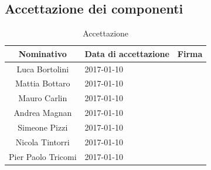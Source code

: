 \documentclass[a4paper,titlepage]{article}
\begin{document}
\subsection{Accettazione dei componenti}
\begin{table}[htbp]
	\begin{center}
		\setlength{\extrarowheight}{\jot}
		\begin{tabular}{|c|p{3.5cm}|p{6cm}|}
			\hline
			\textbf{Nominativo} & \textbf{Data di accettazione} & \textbf{Firma} \\[1ex]
			\hline
			Luca Bortolini	&	2017-01-10	& \\[1ex]
			\hline
			Mattia Bottaro		&	2017-01-10	& \\[1ex]
			\hline
			Mauro Carlin	&	2017-01-10	& \\[1ex]
			\hline
			Andrea Magnan	&	2017-01-10	& \\[1ex]
			\hline
			Simeone Pizzi	&	2017-01-10	& \\[1ex]
			\hline
			Nicola Tintorri	&	2017-01-10	& \\[1ex]
			\hline
			Pier Paolo Tricomi	&	2017-01-10	& \\[1ex]
			\hline
		\end{tabular}
	\end{center}
	\caption{Accettazione}
\end{table}
\end{document}
